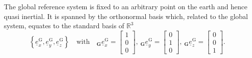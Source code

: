 The global reference system
is fixed to an arbitrary point on the earth
and hence quasi inertial.
It is spanned by the orthonormal basis
which,
related to the global system,
equates to the standard basis of $\mathbb{R}^3$
\begin{equation}
    \left\{
        \underline e^\text{G}_x,
        \underline e^\text{G}_y,
        \underline e^\text{G}_z
    \right\}
    \quad\text{with}\quad 
    {}_\textbf{G}\underline e^\text{G}_x 
    = 
    \begin{bmatrix}
        1 \\ 0 \\ 0
    \end{bmatrix}
    ,\ 
    {}_\textbf{G}\underline e^\text{G}_y 
    = 
    \begin{bmatrix}
        0 \\ 1 \\ 0
    \end{bmatrix}
    ,\ 
    {}_\textbf{G}\underline e^\text{G}_z 
        = 
        \begin{bmatrix}
            0 \\ 0 \\ 1
        \end{bmatrix}.
\end{equation}


